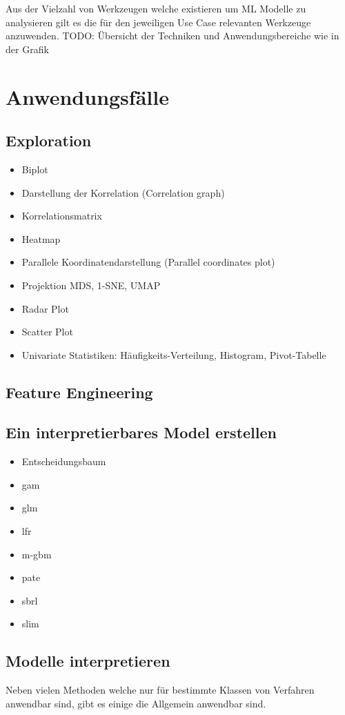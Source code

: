 \documentclass[
  12pt, %
  a4paper, %
  oneside, %
  openany, 
  numbers=noenddot, %
  BCOR=5mm, %
  parskip=half*, %
  thesis, %
]{bfhbook}
\begin{document}
Aus der Vielzahl von Werkzeugen welche existieren um \acrfull{ML} Modelle zu analysieren gilt es die für den jeweiligen Use Case relevanten Werkzeuge anzuwenden.
TODO: Übersicht der Techniken und Anwendungsbereiche wie in der Grafik

\section{Anwendungsfälle}
\subsection{Exploration}
\begin{itemize}
	\item Biplot
	\item Darstellung der Korrelation (Correlation graph)
	\item Korrelationsmatrix
	\item Heatmap
	\item Parallele Koordinatendarstellung (Parallel coordinates plot)
	\item Projektion MDS, 1-SNE, UMAP
	\item Radar Plot
	\item Scatter Plot
	\item Univariate Statistiken: Häufigkeits-Verteilung, Histogram, Pivot-Tabelle
\end{itemize}
\subsection{Feature Engineering}
\subsection{Ein interpretierbares Model erstellen}
\begin{itemize}
	\item Entscheidungsbaum
	\item \acrfull{gam}
	\item \acrfull{glm}
	\item \acrfull{lfr}
	\item \acrfull{m-gbm}
	\item \acrfull{pate}	
	\item \acrfull{sbrl}
	\item \acrfull{slim}
\end{itemize}
\subsection{Modelle interpretieren}
Neben vielen Methoden welche nur für bestimmte Klassen von Verfahren anwendbar sind, gibt es einige die Allgemein anwendbar sind.
\end{document}
